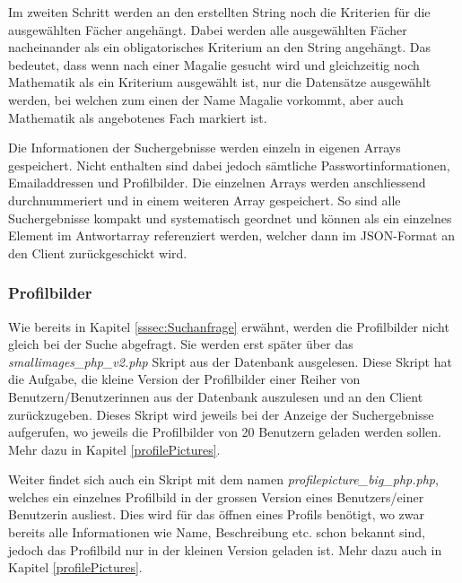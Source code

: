 \documentclass[a4paper,11pt]{report}
\begin{document}
					Im zweiten Schritt werden an den erstellten String noch die Kriterien für die ausgewählten Fächer angehängt. Dabei werden alle ausgewählten Fächer nacheinander als ein obligatorisches Kriterium an den String angehängt. Das bedeutet, dass wenn nach einer \glqq Magalie\grqq{} gesucht wird und gleichzeitig noch Mathematik als ein Kriterium ausgewählt ist, nur die Datensätze ausgewählt werden, bei welchen zum einen der Name \glqq Magalie\grqq{} vorkommt, aber auch Mathematik als angebotenes Fach markiert ist.
					
					Die Informationen der Suchergebnisse werden einzeln in eigenen Arrays gespeichert. Nicht enthalten sind dabei jedoch sämtliche Passwortinformationen, Emailaddressen und Profilbilder. Die einzelnen Arrays werden anschliessend durchnummeriert und in einem weiteren Array gespeichert. So sind alle Suchergebnisse kompakt und systematisch geordnet und können als ein einzelnes Element im Antwortarray referenziert werden, welcher dann im JSON-Format an den Client zurückgeschickt wird.
					
					\subsubsection{Profilbilder} %
					Wie bereits in Kapitel \ref{sssec:Suchanfrage} erwähnt, werden die Profilbilder nicht gleich bei der Suche abgefragt. Sie werden erst später über das \emph{smallimages\_php\_v2.php} Skript aus der Datenbank ausgelesen. Diese Skript hat die Aufgabe, die kleine Version der Profilbilder einer Reiher von Benutzern/Benutzerinnen aus der Datenbank auszulesen und an den Client zurückzugeben. Dieses Skript wird jeweils bei der Anzeige der Suchergebnisse aufgerufen, wo jeweils die Profilbilder von 20 Benutzern geladen werden sollen. Mehr dazu in Kapitel \ref{profilePictures}.
					
					Weiter findet sich auch ein Skript mit dem namen \emph{profilepicture\_big\_php.php}, welches ein einzelnes Profilbild  in der grossen Version eines Benutzers/einer Benutzerin ausliest. Dies wird für das öffnen eines Profils benötigt, wo zwar bereits alle Informationen wie Name, Beschreibung etc. schon bekannt sind, jedoch das Profilbild nur in der kleinen Version geladen ist. Mehr dazu auch in Kapitel \ref{profilePictures}.
					 
					
\end{document}
